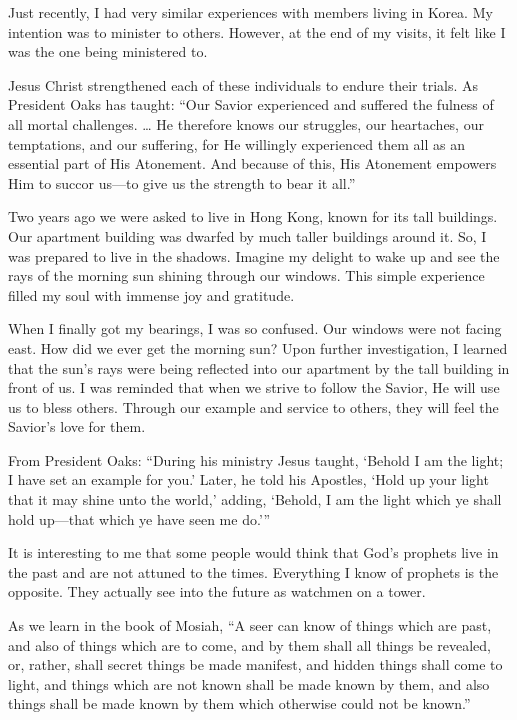 \documentclass[letterpaper, 11pt]{report}
\newcommand{\intalkheader}[1]{
    \vspace{0.75em}
    \noindent{\normalsize\bfseries #1}
    \par\nopagebreak %
    \vspace{0.25em}
    \nopagebreak     %
}
\begin{document}
Just recently, I had very similar experiences with members living in Korea. My intention was to minister to others. However, at the end of my visits, it felt like I was the one being ministered to.

Jesus Christ strengthened each of these individuals to endure their trials. As President Oaks has taught: “Our Savior experienced and suffered the fulness of all mortal challenges. … He therefore knows our struggles, our heartaches, our temptations, and our suffering, for He willingly experienced them all as an essential part of His Atonement. And because of this, His Atonement empowers Him to succor us﻿—to give us the strength to bear it all.”

\intalkheader{Ye Are the Light of the World}

Two years ago we were asked to live in Hong Kong, known for its tall buildings. Our apartment building was dwarfed by much taller buildings around it. So, I was prepared to live in the shadows. Imagine my delight to wake up and see the rays of the morning sun shining through our windows. This simple experience filled my soul with immense joy and gratitude.

When I finally got my bearings, I was so confused. Our windows were not facing east. How did we ever get the morning sun? Upon further investigation, I learned that the sun’s rays were being reflected into our apartment by the tall building in front of us. I was reminded that when we strive to follow the Savior, He will use us to bless others. Through our example and service to others, they will feel the Savior’s love for them.

From President Oaks: “During his ministry Jesus taught, ‘Behold I am the light; I have set an example for you.’ Later, he told his Apostles, ‘Hold up your light that it may shine unto the world,’ adding, ‘Behold, I am the light which ye shall hold up﻿—that which ye have seen me do.’”

It is interesting to me that some people would think that God’s prophets live in the past and are not attuned to the times. Everything I know of prophets is the opposite. They actually see into the future as watchmen on a tower.

As we learn in the book of Mosiah, “A seer can know of things which are past, and also of things which are to come, and by them shall all things be revealed, or, rather, shall secret things be made manifest, and hidden things shall come to light, and things which are not known shall be made known by them, and also things shall be made known by them which otherwise could not be known.”
\end{document}
